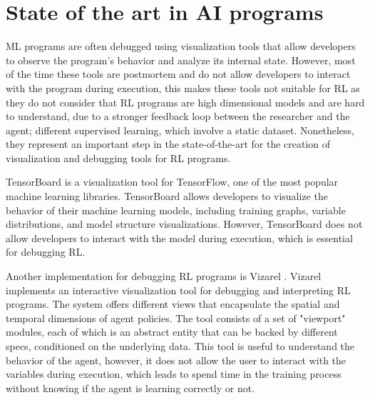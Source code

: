 \section{State of the art in \ac{AI} programs}
\label{sec:ai}

\ac{ML} programs are often debugged using visualization 
tools that allow developers to observe the program's behavior and analyze its internal state. 
However, most of the time these tools are postmortem and do not allow developers to interact 
with the program during execution, this makes these tools not suitable for \ac{RL} as they 
do not consider that \ac{RL} programs are high dimensional models and are hard to understand, 
due to a stronger feedback loop between the researcher and the agent; different 
supervised learning, which involve a static dataset. Nonetheless, they 
represent an important step in the state-of-the-art for the creation of visualization 
and debugging tools for \ac{RL} programs.

TensorBoard\cite{tensorboard} is a 
visualization tool for TensorFlow, one of the most popular machine learning libraries. 
TensorBoard allows developers to visualize the behavior of their machine learning models, 
including training graphs, variable distributions, and model structure visualizations. However, 
TensorBoard does not allow developers to interact with the model during execution, which is 
essential for debugging \ac{RL}.

Another implementation for debugging \ac{RL} programs is \ac{Vizarel} \cite{deshpande2020interactivevisualizationdebuggingrl}.
\ac{Vizarel} implements an interactive visualization tool for debugging and interpreting \ac{RL} 
programs. The system offers different views that encapsulate the spatial and temporal dimensions 
of agent policies. The tool consists of a set of "viewport" modules, each of which is an abstract 
entity that can be backed by different specs, conditioned on the underlying data\cite{deshpande2020interactivevisualizationdebuggingrl}. This tool 
is useful to understand the behavior of the agent, however, it does not allow the user to interact with the 
variables during execution, which leads to spend time in the training process without knowing if
the agent is learning correctly or not.

